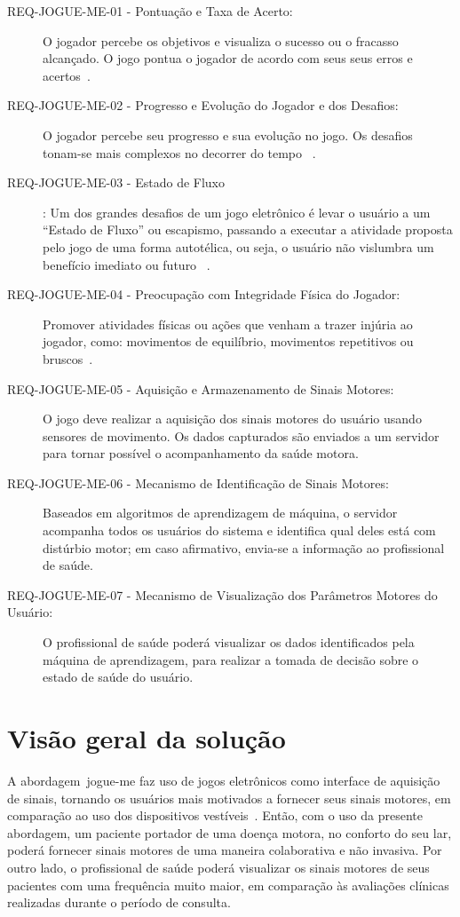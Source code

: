 \begin{description}
	\item[REQ-JOGUE-ME-01 - Pontuação e Taxa de Acerto:] O jogador percebe os objetivos e visualiza o sucesso ou o fracasso alcançado. O jogo pontua o jogador de acordo com seus seus erros e acertos~\cite{Suhonen:2008:SFE:1457199.1457204,sinclair07}.
	\item[REQ-JOGUE-ME-02 - Progresso e Evolução do Jogador e dos Desafios:] O jogador percebe seu progresso e sua evolução no jogo. Os desafios tonam-se mais complexos no decorrer do tempo ~\cite{Suhonen:2008:SFE:1457199.1457204}.
	\item[REQ-JOGUE-ME-03 - Estado de Fluxo]: Um dos grandes desafios de um jogo eletrônico é levar o usuário a um ``Estado de Fluxo'' ou escapismo, passando a executar a atividade proposta pelo jogo de uma forma autotélica, ou seja, o usuário não vislumbra um benefício imediato ou futuro ~\cite{sweetser2005-gameflow}. 
	\item[REQ-JOGUE-ME-04 - Preocupação com Integridade Física do Jogador:] Promover atividades físicas ou ações que venham a trazer injúria ao jogador, como: movimentos de equilíbrio, movimentos repetitivos ou bruscos~\cite{arntzen2011,sinclair07}.
	\item[REQ-JOGUE-ME-05 - Aquisição e Armazenamento de Sinais Motores:] O jogo deve realizar a aquisição dos sinais motores do usuário usando sensores de movimento. Os dados capturados são enviados a um servidor para tornar possível o acompanhamento da saúde motora.
	\item[REQ-JOGUE-ME-06 - Mecanismo de Identificação de Sinais Motores:] Baseados em algoritmos de aprendizagem de máquina, o servidor acompanha todos os usuários do sistema e identifica qual deles está com distúrbio motor; em caso afirmativo, envia-se a informação ao profissional de saúde.
	\item[REQ-JOGUE-ME-07 - Mecanismo de Visualização dos Parâmetros Motores do Usuário:] O profissional de saúde poderá visualizar os dados identificados pela máquina de aprendizagem, para realizar a tomada de decisão sobre o estado de saúde do usuário.
\end{description}

\section{Visão geral da solução}

A abordagem~\ac{jogue-me} faz uso de jogos eletrônicos como interface de aquisição de sinais, tornando os usuários mais motivados a fornecer seus sinais motores, em comparação ao uso dos dispositivos vestíveis~\cite{alemdar}. Então, com o uso da presente abordagem, um paciente portador de uma doença motora, no conforto do seu lar, poderá fornecer sinais motores de uma maneira colaborativa e não invasiva. Por outro lado, o profissional de saúde poderá visualizar os sinais motores de seus pacientes com uma frequência muito maior, em comparação às avaliações clínicas realizadas durante o período de consulta. 

